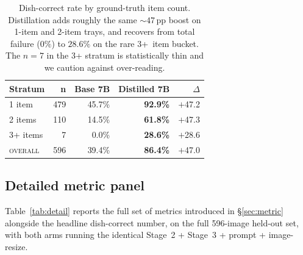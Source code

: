 \begin{table}[t]
\centering\small
\begin{tabular}{lrrrr}
\toprule
\textbf{Stratum} & \textbf{n} & \textbf{Base 7B} & \textbf{Distilled 7B} & \textbf{$\Delta$} \\
\midrule
1 item              & 479 & 45.7\% & \textbf{92.9\%} & $+$47.2 \\
2 items             & 110 & 14.5\% & \textbf{61.8\%} & $+$47.3 \\
3+ items            &  7  & 0.0\%  & \textbf{28.6\%} & $+$28.6 \\
\midrule
\textsc{overall}    & 596 & 39.4\% & \textbf{86.4\%} & $+$47.0 \\
\bottomrule
\end{tabular}
\caption{Dish-correct rate by ground-truth item count. Distillation adds
roughly the same $\sim$$47$\,pp boost on 1-item and 2-item trays, and
recovers from total failure ($0\%$) to $28.6\%$ on the rare 3+~item
bucket. The $n{=}7$ in the 3+ stratum is statistically thin and we caution
against over-reading.}
\label{tab:by-cardinality}
\end{table}

\subsection{Detailed metric panel}
\label{sec:exp:panel}

Table~\ref{tab:detail} reports the full set of metrics introduced in
\S\ref{sec:metric} alongside the headline dish-correct number, on the
full 596-image held-out set, with both arms running the identical
Stage~2 + Stage~3 + prompt + image-resize.

